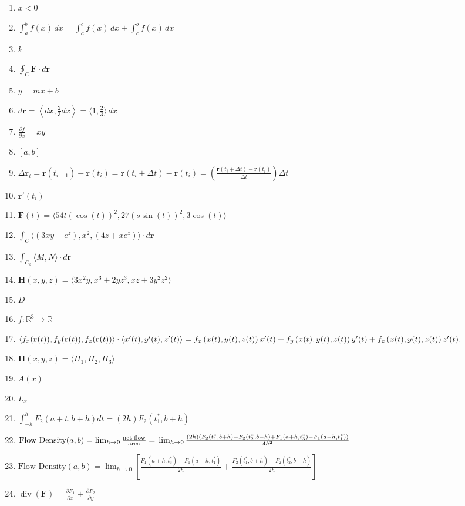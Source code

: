 \documentclass[oneside,10pt,]{article}
\newcommand{\R}{\mathbb{R}}
\newcommand{\vr}{\mathbf{r}}
\newcommand{\vF}{\mathbf{F}}
\newcommand{\vH}{\mathbf{H}}
\DeclareMathOperator{\divg}{div}
\newcommand{\lt}{<}
\begin{document}
\begin{enumerate}
\item{}\(x\lt 0\)%
\item{}\(\int_a^b f(x)\, dx = \int_a^c f(x)\, dx + \int_c^b f(x)\, dx\)%
\item{}\(k\)%
\item{}\(\oint_C \vF\cdot d\vr\)%
\item{}\(y=mx+b\)%
\item{}\(d\vr = \left\langle dx,\frac{2}{3}dx\right\rangle =
\langle 1,\frac{2}{3} \rangle\, dx\)%
\item{}\(\frac{\partial f}{\partial x} =
xy \)%
\item{}\([a,b]\)%
\item{}\(\Delta \vr_i = \vr(t_{i+1}) - \vr(t_{i}) = \vr(t_{i} +
\Delta t) - \vr(t_{i}) = \left(\frac{\vr(t_{i} + \Delta t) -
\vr(t_{i})}{\Delta t}\right) \Delta t \)%
\item{}\(\vr'(t_i)\)%
\item{}\(\vF(t) =\langle 54t(\cos(t))^2, 27(s\sin(t))^2,3 \cos(t)\rangle \)%
\item{}\(\int_C \langle (3xy+e^z), x^2,
(4z+xe^z)\rangle\cdot d\vr\)%
\item{}\(\int_{C_3}
\langle M, N\rangle\cdot d\vr\)%
\item{}\(\vH(x,y,z) = \langle 3x^2
y,x^3+2yz^3,xz+3y^2z^2\rangle\)%
\item{}\(D\)%
\item{}\(f\colon \R^3\to \R\)%
\item{}\(\langle f_x(\vr(t)), f_y(\vr(t)), f_z(\vr(t))\rangle\cdot \langle x'(t),y'(t),z'(t)\rangle =\\ 
f_x\left( x(t),y(t),z(t) \right) x'(t) + f_y \left( x(t),y(t),z(t) \right) y'(t) + f_z \left( x(t),y(t),z(t) \right) z'(t).\)%
\item{}\(\vH(x,y,z) = \langle H_1,H_2,H_3\rangle\)%
\item{}\(A(x)\)%
\item{}\(L_x\)%
\item{}\(\int_{-h}^{h} F_2(a+t,b+h) dt = (2h) F_2(t^*_1,b+h)\)%
\item{}\(\text{Flow Density}(a,b)=\lim_{h\rightarrow 0} \frac{\text{net flow}}{\text{area}} =\\
\lim_{h\rightarrow 0} \frac{(2h) \left(F_2(t^*_1,b+h)-F_2(t^*_2,b-h)+F_1(a+h,t^*_3)-F_1(a-h,t^*_1)\right)}{4h^2}\)%
\item{}\(\text{Flow Density}(a,b)= \lim_{h\rightarrow 0}\left[
\frac{F_1(a+h,t^*_3)-F_1(a-h,t^*_1)}{2h}+\frac{F_2(t^*_1,b+h)-F_2(t^*_2,b-h)}{2h}\right]\)%
\item{}\(\divg(\vF)=\frac{\partial F_1}{\partial x}+\frac{\partial F_2}{\partial y}\)%

\end{enumerate}
\end{document}
